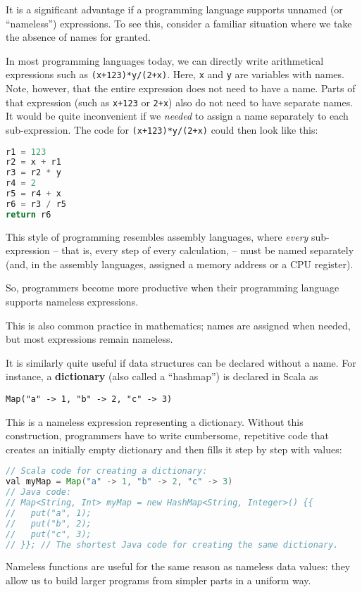 It is a significant advantage if a programming language supports unnamed
(or ``nameless'') expressions. To see this, consider a familiar
situation where we take the absence of names for granted.

In most programming languages today, we can directly write arithmetical
expressions such as \texttt{}\lstinline!(x+123)*y/(2+x)!.
Here, \texttt{}\lstinline!x!
and \texttt{}\lstinline!y!
are variables with names. Note, however, that the entire expression
does not need to have a name. Parts of that expression (such as \texttt{}\lstinline!x+123!
or \lstinline!2+x!) also
do not need to have separate names. It would be quite inconvenient
if we \emph{needed} to assign a name separately to each sub-expression.
The code for \lstinline!(x+123)*y/(2+x)!
could then look like this:
\begin{lstlisting}[language=Python]
r1 = 123
r2 = x + r1
r3 = r2 * y
r4 = 2
r5 = r4 + x
r6 = r3 / r5
return r6
\end{lstlisting}
This style of programming resembles assembly languages,
where \emph{every} sub-expression – that is, every step of every calculation,
– must be named separately (and, in the assembly languages, assigned
a memory address or a CPU register).

So, programmers become more productive when their programming language
supports nameless expressions.

This is also common practice in mathematics; names are assigned when
needed, but most expressions remain nameless.

It is similarly quite useful if data structures can be declared without
a name. For instance, a \textbf{dictionary} (also
called a ``hashmap'') is declared in Scala as
\begin{lstlisting}
Map("a" -> 1, "b" -> 2, "c" -> 3)
\end{lstlisting}
This is a nameless expression representing a dictionary. Without this
construction, programmers have to write cumbersome, repetitive code
that creates an initially empty dictionary and then fills it step
by step with values:
\begin{lstlisting}[language=Java]
// Scala code for creating a dictionary:
val myMap = Map("a" -> 1, "b" -> 2, "c" -> 3)
// Java code:
// Map<String, Int> myMap = new HashMap<String, Integer>() {{
//   put("a", 1);
//   put("b", 2);
//   put("c", 3);
// }}; // The shortest Java code for creating the same dictionary.
\end{lstlisting}
Nameless functions are useful for the same reason as nameless data
values: they allow us to build larger programs from simpler parts
in a uniform way.

